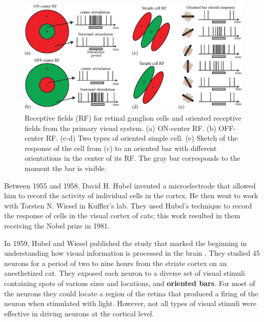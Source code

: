 \begin{figure}[t]
\centerline{
\includegraphics[width=1\linewidth]{figures/taxonomy/receptive_fields.eps}
} 
\caption{Receptive fields (RF) for retinal ganglion cells and oriented receptive fields from the primary visual system. (a) ON-center RF. (b) OFF-center RF. (c-d) Two types of oriented simple cell. (e) Sketch of the response of the cell from (c) to an oriented bar with different orientations in the center of its RF. The gray bar corresponds to the moment the bar is visible.} 
\label{fig:receptivefields}
\end{figure}

Between 1955 and 1958, David H. Hubel invented a microelectrode that allowed him to record the activity of individual cells in the cortex. He then went to work with Torsten N. Wiesel in Kuffler's lab. They used Hubel's technique to record the response of cells in the visual cortex of cats; this work resulted in them receiving the Nobel prize in 1981.



In 1959, Hubel and Wiesel published the study that marked the beginning in understanding how visual information is processed in the brain \cite{HubelWiesel59}. They studied 45 neurons for a period of two to nine hours from the striate cortex on an anesthetized cat. They exposed each neuron to a diverse set of visual stimuli containing spots of various sizes and locations, and {\bf oriented bars}. For most of the neurons they could locate a region of the retina that produced a firing of the neuron when stimulated with light. However, not all types of visual stimuli were effective in driving neurons at the cortical level. %

